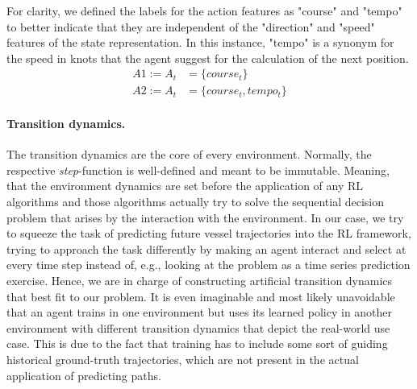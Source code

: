 For clarity, we defined the labels for the action features as "course" and "tempo" to better indicate that they are independent of the "direction" and "speed" features of the state representation. In this instance, "tempo" is a synonym for the speed in knots that the agent suggest for the calculation of the next position.
\begin{equation}
\begin{aligned}
    A1 := A_t &= \{course_t\}
\\
    A2 := A_t &= \{course_t, tempo_t\}
    \end{aligned}
\end{equation}

\paragraph{Transition dynamics.} The transition dynamics are the  core of every environment. Normally, the respective \textit{step}-function is well-defined and meant to be immutable. Meaning, that the environment dynamics are set before the application of any RL algorithms and those algorithms actually try to solve the sequential decision problem that arises by the interaction with the environment. In our case, we try to squeeze the task of predicting future vessel trajectories into the RL framework, trying to approach the task differently by making an agent interact and select at every time step instead of, e.g., looking at the problem as a time series prediction exercise. Hence, we are in charge of constructing artificial transition dynamics that best fit to our problem. It is even imaginable and most likely unavoidable that an agent trains in one environment but uses its learned policy in another environment with different transition dynamics that depict the real-world use case. This is due to the fact that training has to include some sort of guiding historical ground-truth trajectories, which are not present in the actual application of predicting paths.
\par
